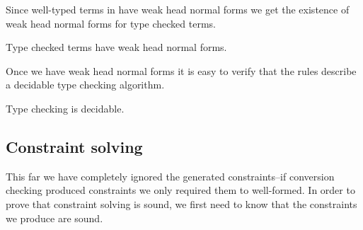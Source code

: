 


Since well-typed terms in {\Core} have weak head normal forms we get the
existence of weak head normal forms for type checked terms.

\begin{corollary}
    Type checked terms have weak head normal forms.
\end{corollary}

Once we have weak head normal forms it is easy to verify that the rules
describe a decidable type checking algorithm.

\begin{corollary}
    Type checking is decidable.
\end{corollary}

\subsection{Constraint solving}

This far we have completely ignored the generated constraints--if conversion
checking produced constraints we only required them to well-formed. In order to
prove that constraint solving is sound, we first need to know that the
constraints we produce are sound.

